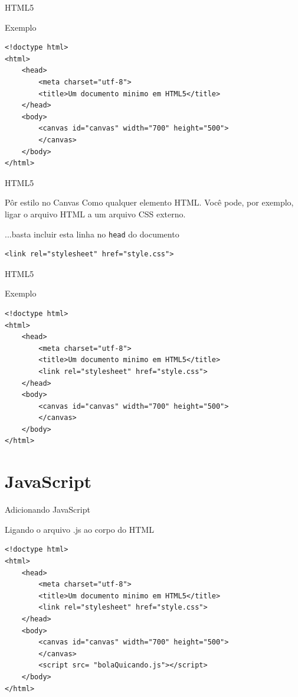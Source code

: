 \documentclass[xcolor=dvipsnames,table]{beamer}
\begin{document}
\begin{frame}[fragile]{HTML5}
	\begin{block}{Exemplo}
		\begin{lstlisting}
<!doctype html>
<html>
	<head>
		<meta charset="utf-8">
		<title>Um documento minimo em HTML5</title>
	</head>
	<body>
		<canvas id="canvas" width="700" height="500">
		</canvas>
	</body>
</html>
\end{lstlisting}
		\end{block}
\end{frame}

\begin{frame}[fragile]{HTML5}
	\begin{block}{Pôr estilo no Canvas}
		Como qualquer elemento HTML. Você pode, por exemplo, ligar o arquivo HTML a um arquivo CSS externo.
	\end{block} \pause
	\begin{block}{...basta incluir esta linha no {\tt head} do documento}
			\begin{lstlisting}
<link rel="stylesheet" href="style.css">
\end{lstlisting}
	\end{block}
\end{frame}

\begin{frame}[fragile]{HTML5}
	\begin{block}{Exemplo}
		\begin{lstlisting}
<!doctype html>
<html>
	<head>
		<meta charset="utf-8">
		<title>Um documento minimo em HTML5</title>
		<link rel="stylesheet" href="style.css">
	</head>
	<body>
		<canvas id="canvas" width="700" height="500">
		</canvas>
	</body>
</html>
\end{lstlisting}
		\end{block}
\end{frame}

\section{JavaScript}
\begin{frame}[fragile]{Adicionando JavaScript}
	\begin{block}{Ligando o arquivo .js ao corpo do HTML}
		\begin{lstlisting}
<!doctype html>
<html>
	<head>
		<meta charset="utf-8">
		<title>Um documento minimo em HTML5</title>
		<link rel="stylesheet" href="style.css">
	</head>
	<body>
		<canvas id="canvas" width="700" height="500">
		</canvas>
		<script src= "bolaQuicando.js"></script>
	</body>
</html>
\end{lstlisting}
		\end{block}
\end{frame}
\end{document}
